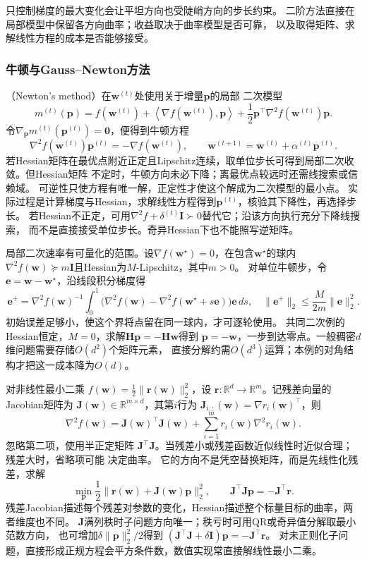 只控制梯度的最大变化会让平坦方向也受陡峭方向的步长约束。
二阶方法直接在局部模型中保留各方向曲率；收益取决于曲率模型是否可靠，
以及取得矩阵、求解线性方程的成本是否能够接受。

\subsubsection{牛顿与Gauss–Newton方法}
\label{sec:opt-newton-gauss-newton}

（Newton's method）在$\bm{w}^{(t)}$处使用关于增量$\bm{p}$的局部
二次模型
\[
  m^{(t)}(\bm{p})
  =
  f(\bm{w}^{(t)})
  +\left\langle\nabla f(\bm{w}^{(t)}),\bm{p}\right\rangle
  +\frac12\bm{p}^{\top}\nabla^2f(\bm{w}^{(t)})\bm{p}.
\]
令$\nabla_{\bm{p}}m^{(t)}(\bm{p}^{(t)})=\bm{0}$，便得到牛顿方程
\[
  \nabla^2 f(\bm{w}^{(t)})\bm{p}^{(t)}
  =-\nabla f(\bm{w}^{(t)}),\qquad
  \bm{w}^{(t+1)}=\bm{w}^{(t)}+\alpha^{(t)}\bm{p}^{(t)}.
\]
若Hessian矩阵在最优点附近正定且Lipschitz连续，取单位步长可得到局部二次收敛。但Hessian矩阵
不定时，牛顿方向未必下降；离最优点较远时还需线搜索或信赖域。
可逆性只使方程有唯一解，正定性才使这个解成为二次模型的最小点。
实际过程是计算梯度与Hessian，求解线性方程得到$\bm p^{(t)}$，核验其下降性，再选择步长。
若Hessian不正定，可用$\nabla^2f+\delta^{(t)}\bm I\succ0$替代它；沿该方向执行充分下降线搜索，
而不是直接接受单位步长。奇异Hessian下也不能照写逆矩阵。

局部二次速率有可量化的范围。设$\nabla f(\bm w^\star)=0$，在包含$\bm w^\star$的球内
$\nabla^2f(\bm w)\succeq m\bm I$且Hessian为$M$-Lipschitz，其中$m>0$。
对单位牛顿步，令$\bm e=\bm w-\bm w^\star$，沿线段积分梯度得
\[
 \bm e^+
 =\nabla^2f(\bm w)^{-1}\!
 \int_0^1\bigl(\nabla^2f(\bm w)-\nabla^2f(\bm w^\star+s\bm e)\bigr)\bm e\,ds,
 \quad
 \|\bm e^+\|_2\leq\frac{M}{2m}\|\bm e\|_2^2.
\]
初始误差足够小，使这个界将点留在同一球内，才可逐轮使用。
共同二次例的Hessian恒定，$M=0$，求解$\bm H\bm p=-\bm H\bm w$得到
$\bm p=-\bm w$，一步到达零点。一般稠密$d$维问题需要存储$O(d^2)$个矩阵元素，
直接分解约需$O(d^3)$运算；本例的对角结构才把这一成本降为$O(d)$。

对非线性最小二乘
$f(\bm{w})=\frac12\lVert\bm{r}(\bm{w})\rVert_2^2$，设
$\bm{r}:\mathbb{R}^d\to\mathbb{R}^m$。记残差向量的Jacobian矩阵为
$\bm{J}(\bm{w})\in\mathbb{R}^{m\times d}$，其第$i$行为
$\bm{J}_{i,:}(\bm{w})=\nabla r_i(\bm{w})^{\top}$，则
\[
  \nabla^2f(\bm{w})
  =\bm{J}(\bm{w})^{\top}\bm{J}(\bm{w})
  +\sum_{i=1}^m r_i(\bm{w})\nabla^2r_i(\bm{w}).
\]
忽略第二项，使用半正定矩阵
$\bm{J}^{\top}\bm{J}$。当残差小或残差函数近似线性时近似合理；残差大时，省略项可能
决定曲率。
它的方向不是凭空替换矩阵，而是先线性化残差，求解
\[
 \min_{\bm p}\frac12\|\bm r(\bm w)+\bm J(\bm w)\bm p\|_2^2,
 \qquad
 \bm J^\top\bm J\bm p=-\bm J^\top\bm r.
\]
残差Jacobian描述每个残差对参数的变化，Hessian描述整个标量目标的曲率，两者维度也不同。
$\bm J$满列秩时子问题方向唯一；秩亏时可用QR或奇异值分解取最小范数方向，
也可增加$\delta\|\bm p\|_2^2/2$得到
$(\bm J^\top\bm J+\delta\bm I)\bm p=-\bm J^\top\bm r$。
对未正则化子问题，直接形成正规方程会平方条件数，数值实现常直接解线性最小二乘。

